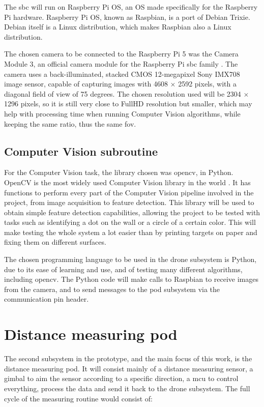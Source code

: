 The \gls{sbc} will run on Raspberry Pi OS, an OS made specifically for the Raspberry Pi
hardware. Raspberry Pi OS, known as Raspbian, is a port of Debian Trixie. Debian
itself is a Linux distribution, which makes Raspbian also a Linux distribution.

The chosen camera to be connected to the Raspberry Pi 5 was the Camera Module 3, an
official camera module for the Raspberry Pi \gls{sbc} family \cite{raspcam}. The camera
uses a back-illuminated, stacked CMOS 12-megapixel Sony IMX708 image sensor, capable
of capturing images with 4608 $\times$ 2592 pixels, with a diagonal field of view of 75
degrees. The chosen resolution used will be 2304 $\times$ 1296 pixels, so it is still
very close to FullHD resolution but smaller, which may help with processing time when
running Computer Vision algorithms, while keeping the same ratio, thus the same
\gls{fov}.

\subsection{Computer Vision subroutine}

For the Computer Vision task, the library chosen was \gls{opencv}, in Python.
OpenCV is the most widely used Computer Vision library in the world \cite{opencv}.
It has functions to perform every part of the Computer Vision pipeline involved in
the project, from image acquisition to feature detection.
This library will be used to obtain simple feature detection capabilities,
allowing the project to be tested with tasks such as identifying a dot on the
wall or a circle of a certain color.
This will make testing the whole system a lot easier than by printing targets
on paper and fixing them on different surfaces.

The chosen programming language to be used in the drone subsystem is Python, due to
its ease of learning and use, and of testing many different algorithms,
including \gls{opencv}.
The Python code will make calls to Raspbian to receive images from the camera, and to
send messages to the pod subsystem via the communication pin header.

\section{Distance measuring pod}

The second subsystem in the prototype, and the main focus of this work, is the distance
measuring pod. It will consist mainly of a distance measuring sensor, a gimbal to aim the
sensor according to a specific direction, a \gls{mcu} to control everything,
process the data and send it back to the drone subsystem.
The full cycle of the measuring routine would consist of:

